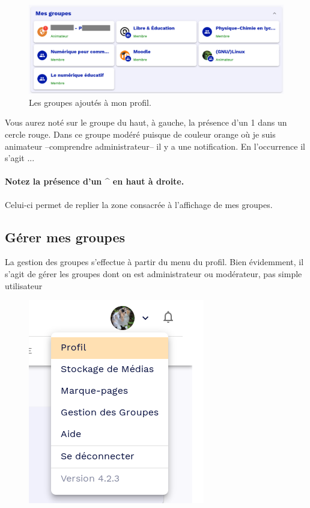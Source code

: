 \begin{figure}
	\centering
	\includegraphics{./Captures/portail.accueil.mes.groupes.png}
	\caption{Les groupes ajoutés à mon profil.}
\end{figure}

Vous aurez noté sur le groupe du haut, à gauche, la présence d'un 1 dans un cercle rouge. 
Dans ce groupe modéré puisque de couleur orange où je suis animateur --comprendre administrateur-- il y a une notification. 
En l'occurrence il s'agit ...

\paragraph{Notez la présence d'un \^{} en haut à droite.}
Celui-ci permet de replier la zone consacrée à l'affichage de mes groupes.

\subsection{Gérer mes groupes}
La gestion des groupes s'effectue à partir du menu du profil. 
Bien évidemment, il s'agit de gérer les groupes dont on est administrateur ou modérateur, pas simple utilisateur
\begin{figure}
	\centering
	\includegraphics[width=0.3333\linewidth]{./Captures/menu.profil.png}
\end{figure}

